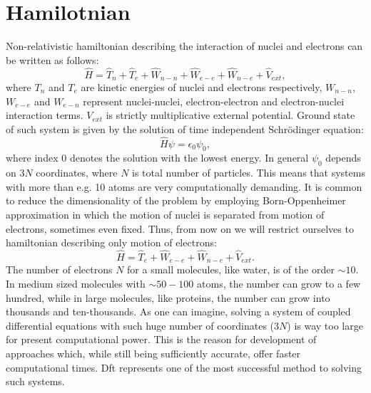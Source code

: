 \documentclass[openany, longbibliography,slovene,a4paper,12pt]{article}
\begin{document}
\section{Hamilotnian}
Non-relativistic hamiltonian describing the interaction of  nuclei and electrons can be
written as follows:
\begin{equation} \label{full_hamiltonian}
\hat H= \hat T_n + \hat  T_e + \hat  W_{n-n} + \hat W_{e-e} + \hat W_{n-e} + \hat V_{ext},
\end{equation}
where $T_n$ and $T_e$ are kinetic energies of nuclei and electrons respectively,
$W_{n-n}$, $W_{e-e}$ and $W_{e-n}$ represent  nuclei-nuclei, electron-electron
and electron-nuclei interaction terms. $V_{ext}$ is strictly multiplicative external potential. Ground state of such system is given by the solution of time independent Schr{\"o}dinger equation:
\begin{equation} \label{ham_solution}
\hat H \psi = \epsilon_0 \psi_0,
\end{equation} 
where index $0$ denotes the solution with the lowest energy. In general $\psi_0$
depends on $3N$ coordinates, where $N$ is total number of particles. This means
that systems with more than e.g. 10 atoms are very computationally
demanding. It is common to reduce the dimensionality of the problem by employing
Born-Oppenheimer approximation in which the motion of nuclei is separated from
motion of electrons, sometimes even fixed. Thus, from now on we will restrict
ourselves to hamiltonian describing only motion of electrons:
\begin{equation} \label{electron_hamiltonian}
\hat H=  \hat  T_e  + \hat W_{e-e} + \hat W_{n-e} + \hat V_{ext}.
\end{equation}
The number of electrons $N$ for a small molecules, like water, is of the order $\sim
10$. In medium sized molecules with $\sim 50-100$ atoms, the number can grow to a few
hundred, while in large molecules, like proteins, the number can grow into
thousands and ten-thousands. As one can imagine, solving a system of coupled differential equations
with such huge number of coordinates ($3N$) is way too large for present
computational power. This is the reason for development of approaches which,
while still being sufficiently accurate, offer faster computational times. Dft
represents one of the most successful method to solving such systems.
\end{document}
